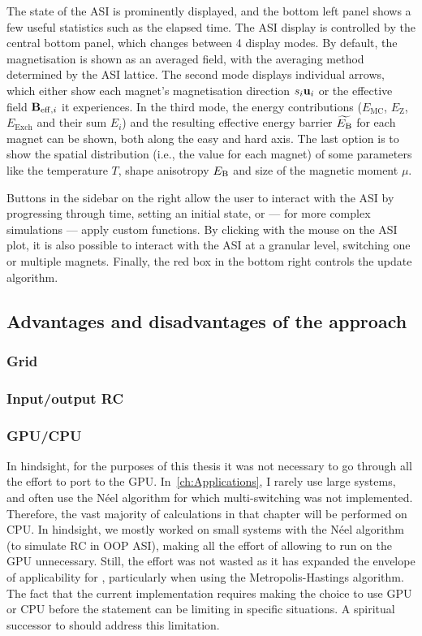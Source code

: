 The state of the ASI is prominently displayed, and the bottom left panel shows a few useful statistics such as the elapsed time. The ASI display is controlled by the central bottom panel, which changes between 4 display modes.
By default, the magnetisation is shown as an averaged field, with the averaging method determined by the ASI lattice.
The second mode displays individual arrows, which either show each magnet's magnetisation direction $s_i \boldsymbol{\mathbf{u}}_i$ or the effective field $\boldsymbol{\mathbf{B}}_{\mathrm{eff},i}$ it experiences.
In the third mode, the energy contributions ($E_\mathrm{MC}$, $E_\mathrm{Z}$, $E_\mathrm{Exch}$ and their sum $E_i$) and the resulting effective energy barrier $\widetilde{E_\mathrm{B}}$ for each magnet can be shown, both along the easy and hard axis.
The last option is to show the spatial distribution (i.e., the value for each magnet) of some parameters like the temperature $T$, shape anisotropy $E_\mathrm{B}$ and size of the magnetic moment $\mu$. \par
Buttons in the sidebar on the right allow the user to interact with the ASI by progressing through time, setting an initial state, or --- for more complex simulations --- apply custom functions.
By clicking with the mouse on the ASI plot, it is also possible to interact with the ASI at a granular level, switching one or multiple magnets. Finally, the red box in the bottom right controls the update algorithm.

\subsection{Advantages and disadvantages of the \hotspice approach} %
\subsubsection{Grid}
\subsubsection{Input/output RC}
\subsubsection{GPU/CPU}
In hindsight, for the purposes of this thesis it was not necessary to go through all the effort to port \hotspice to the GPU.
In~\cref{ch:Applications}, I rarely use large systems, and often use the N\'eel algorithm for which multi-switching was not implemented.
Therefore, the vast majority of calculations in that chapter will be performed on CPU. 
In hindsight, we mostly worked on small systems with the N\'eel algorithm (to simulate RC in OOP ASI), making all the effort of allowing \hotspice to run on the GPU unnecessary. Still, the effort was not wasted as it has expanded the envelope of applicability for \hotspice, particularly when using the Metropolis-Hastings algorithm.
The fact that the current implementation requires making the choice to use GPU or CPU before the  statement can be limiting in specific situations. A spiritual successor to \hotspice should address this limitation.

